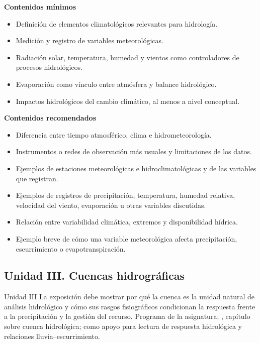 \documentclass[11pt]{article}
\begin{document}
\textbf{Contenidos mínimos}
\begin{itemize}
\item Definición de elementos climatológicos relevantes para hidrología.
\item Medición y registro de variables meteorológicas.
\item Radiación solar, temperatura, humedad y vientos como controladores de procesos hidrológicos.
\item Evaporación como vínculo entre atmósfera y balance hidrológico.
\item Impactos hidrológicos del cambio climático, al menos a nivel conceptual.
\end{itemize}

\textbf{Contenidos recomendados}
\begin{itemize}
\item Diferencia entre tiempo atmosférico, clima e hidrometeorología.
\item Instrumentos o redes de observación más usuales y limitaciones de los datos.
\item Ejemplos de estaciones meteorológicas e hidroclimatológicas y de las variables que registran.
\item Ejemplos de registros de precipitación, temperatura, humedad relativa, velocidad del viento, evaporación u otras variables discutidas.
\item Relación entre variabilidad climática, extremos y disponibilidad hídrica.
\item Ejemplo breve de cómo una variable meteorológica afecta precipitación, escurrimiento o evapotranspiración.
\end{itemize}

\subsection{Unidad III. Cuencas hidrográficas}
\unitbox
{Unidad III}
{La exposición debe mostrar por qué la cuenca es la unidad natural de análisis hidrológico y cómo sus rasgos fisiográficos condicionan la respuesta frente a la precipitación y la gestión del recurso.}
{Programa de la asignatura; \textcite{aparicio1989}, capítulo sobre cuenca hidrológica; \textcite{mays2011} como apoyo para lectura de respuesta hidrológica y relaciones lluvia--escurrimiento.}
\end{document}
